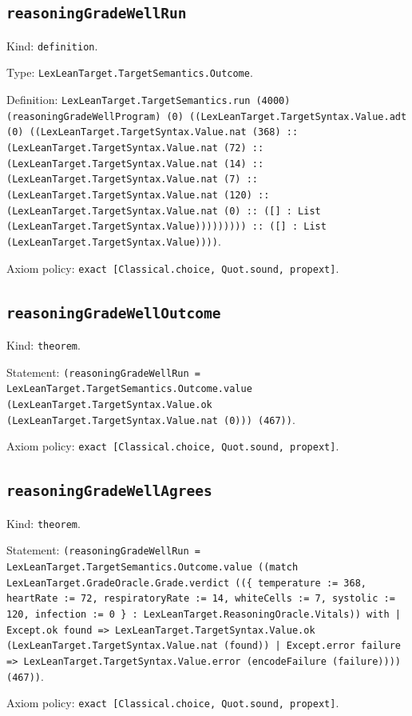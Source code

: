 \documentclass[11pt]{article}
\begin{document}
\subsection*{\texttt{reasoningGradeWellRun}}
\noindent Kind: \texttt{definition}.\par
\noindent Type: \texttt{LexLeanTarget.TargetSemantics.Outcome}.\par
\noindent Definition: \texttt{LexLeanTarget.TargetSemantics.run (4000) (reasoningGradeWellProgram) (0) ((LexLeanTarget.TargetSyntax.Value.adt (0) ((LexLeanTarget.TargetSyntax.Value.nat (368) :: (LexLeanTarget.TargetSyntax.Value.nat (72) :: (LexLeanTarget.TargetSyntax.Value.nat (14) :: (LexLeanTarget.TargetSyntax.Value.nat (7) :: (LexLeanTarget.TargetSyntax.Value.nat (120) :: (LexLeanTarget.TargetSyntax.Value.nat (0) :: ([] : List (LexLeanTarget.TargetSyntax.Value))))))))) :: ([] : List (LexLeanTarget.TargetSyntax.Value))))}.\par
\noindent Axiom policy: \texttt{exact [Classical.choice, Quot.sound, propext]}.\par
\subsection*{\texttt{reasoningGradeWellOutcome}}
\noindent Kind: \texttt{theorem}.\par
\noindent Statement: \texttt{(reasoningGradeWellRun = LexLeanTarget.TargetSemantics.Outcome.value (LexLeanTarget.TargetSyntax.Value.ok (LexLeanTarget.TargetSyntax.Value.nat (0))) (467))}.\par
\noindent Axiom policy: \texttt{exact [Classical.choice, Quot.sound, propext]}.\par
\subsection*{\texttt{reasoningGradeWellAgrees}}
\noindent Kind: \texttt{theorem}.\par
\noindent Statement: \texttt{(reasoningGradeWellRun = LexLeanTarget.TargetSemantics.Outcome.value ((match LexLeanTarget.GradeOracle.Grade.verdict ((\{ temperature := 368, heartRate := 72, respiratoryRate := 14, whiteCells := 7, systolic := 120, infection := 0 \} : LexLeanTarget.ReasoningOracle.Vitals)) with | Except.ok found => LexLeanTarget.TargetSyntax.Value.ok (LexLeanTarget.TargetSyntax.Value.nat (found)) | Except.error failure => LexLeanTarget.TargetSyntax.Value.error (encodeFailure (failure)))) (467))}.\par
\noindent Axiom policy: \texttt{exact [Classical.choice, Quot.sound, propext]}.\par
\end{document}
